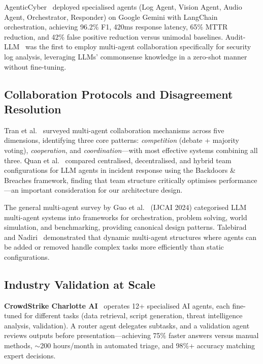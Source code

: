 \documentclass[12pt, a4paper, oneside]{report}
\begin{document}
AgenticCyber~\cite{agenticcyber2025} deployed specialised agents (Log Agent, Vision
Agent, Audio Agent, Orchestrator, Responder) on Google Gemini with LangChain
orchestration, achieving 96.2\% F1, 420ms response latency, 65\% MTTR reduction,
and 42\% false positive reduction versus unimodal baselines.
Audit-LLM~\cite{auditllm2024} was the first to employ multi-agent collaboration
specifically for security log analysis, leveraging LLMs' commonsense knowledge in
a zero-shot manner without fine-tuning.

\subsection{Collaboration Protocols and Disagreement Resolution}

Tran et al.~\cite{tran2025collaboration} surveyed multi-agent collaboration
mechanisms across five dimensions, identifying three core patterns:
\emph{competition} (debate + majority voting), \emph{cooperation}, and
\emph{coordination}---with most effective systems combining all three.
Quan et al.~\cite{quan2024collaboration} compared centralised, decentralised, and
hybrid team configurations for LLM agents in incident response using the Backdoors
\& Breaches framework, finding that team structure critically optimises
performance---an important consideration for our architecture design.

The general multi-agent survey by Guo et al.~\cite{guo2024multiagent} (IJCAI 2024)
categorised LLM multi-agent systems into frameworks for orchestration, problem
solving, world simulation, and benchmarking, providing canonical design patterns.
Talebirad and Nadiri~\cite{talebirad2023multiagent} demonstrated that dynamic
multi-agent structures where agents can be added or removed handle complex tasks
more efficiently than static configurations.

\subsection{Industry Validation at Scale}

\textbf{CrowdStrike Charlotte AI}~\cite{crowdstrike2024charlotte} operates 12+
specialised AI agents, each fine-tuned for different tasks (data retrieval, script
generation, threat intelligence analysis, validation). A router agent delegates
subtasks, and a validation agent reviews outputs before presentation---achieving
75\% faster answers versus manual methods, $\sim$200 hours/month in automated
triage, and 98\%+ accuracy matching expert decisions.
\end{document}
